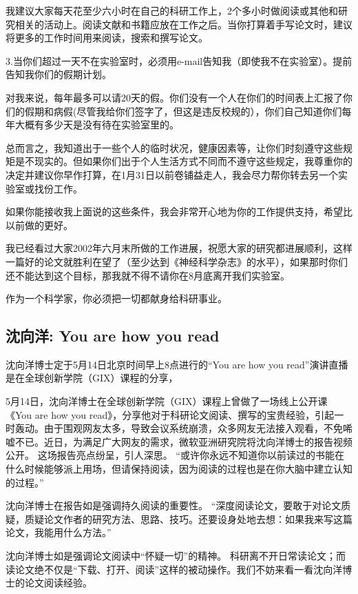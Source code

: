 我建议大家每天花至少六小时在自己的科研工作上，2个多小时做阅读或其他和研究相关的活动上。阅读文献和书籍应放在工作之后。当你打算着手写论文时，建议将更多的工作时间用来阅读，搜索和撰写论文。

3.当你们超过一天不在实验室时，必须用e-mail告知我（即使我不在实验室）。提前告知我你们的假期计划。

对我来说，每年最多可以请20天的假。你们没有一个人在你们的时间表上汇报了你们的假期和病假(尽管我给你们签字了，但这是违反校规的），你们自己知道你们每年大概有多少天是没有待在实验室里的。

总而言之，我知道出于一些个人的临时状况，健康因素等，让你们时刻遵守这些规矩是不现实的。但如果你们出于个人生活方式不同而不遵守这些规定，我尊重你的决定并建议你早作打算，在1月31日以前卷铺益走人，我会尽力帮你转去另一个实验室或找份工作。

如果你能接收我上面说的这些条件，我会非常开心地为你的工作提供支持，希望比以前做的更好。

我已经看过大家2002年六月末所做的工作进展，祝愿大家的研究都进展顺利，这样一篇好的论文就胜利在望了（至少达到《神经科学杂志》的水平），如果那时你们还不能达到这个目标，那我就不得不请你在8月底离开我们实验室。

作为一个科学家，你必须把一切都献身给科研事业。

\subsection{沈向洋: You are how you read }
沈向洋博士定于5月14日北京时间早上8点进行的“You are how you read”演讲直播是在全球创新学院（GIX）课程的分享，



5月14日，沈向洋博士在全球创新学院（GIX）课程上曾做了一场线上公开课《You are how you read》，分享他对于科研论文阅读、撰写的宝贵经验，引起一时轰动。由于围观网友太多，导致会议系统崩溃，众多网友无法接入观看，不免唏嘘不已。近日，为满足广大网友的需求，微软亚洲研究院将沈向洋博士的报告视频公开。 
这场报告亮点纷呈，引人深思。
“或许你永远不知道你以前读过的书能在什么时候能够派上用场，但请保持阅读，因为阅读的过程也是在你大脑中建立认知的过程。”

沈向洋博士在报告如是强调持久阅读的重要性。
“深度阅读论文，要敢于对论文质疑，质疑论文作者的研究方法、思路、技巧。还要设身处地去想：如果我来写这篇论文，我能用什么方法。”

沈向洋博士如是强调论文阅读中“怀疑一切”的精神。
科研离不开日常读论文；而读论文绝不仅是“下载、打开、阅读”这样的被动操作。我们不妨来看一看沈向洋博士的论文阅读经验。

